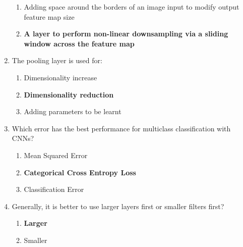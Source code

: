 \documentclass{report}
\numberwithin{equation}{section}
\begin{document}
\begin{enumerate}
\begin{enumerate}[label=\alph*.]
        \item Adding space around the borders of an image input to modify output feature map size
        \item \textbf{A layer to perform non-linear downsampling via a sliding window across the feature map}
    \end{enumerate}
    \item The pooling layer is used for:
    \begin{enumerate}[label=\alph*.]
        \item Dimensionality increase
        \item \textbf{Dimensionality reduction}
        \item Adding parameters to be learnt
    \end{enumerate}
    \item Which error has the best performance for multiclass classification with CNNs?
    \begin{enumerate}[label=\alph*.]
        \item Mean Squared Error
        \item \textbf{Categorical Cross Entropy Loss}
        \item Classification Error
    \end{enumerate}
    \item Generally, it is better to use larger layers first or smaller filters first?
    \begin{enumerate}[label=\alph*.]
        \item \textbf{Larger}
        \item Smaller
    \end{enumerate}
\end{enumerate}
\end{document}
